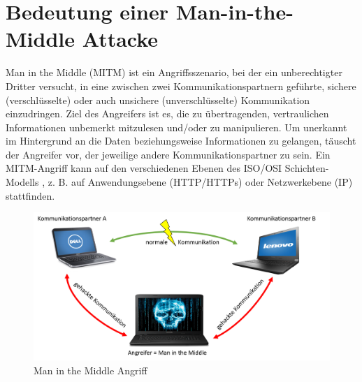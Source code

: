 \section{Bedeutung einer Man-in-the-Middle Attacke}
Man in the Middle (MITM) ist ein Angriffsszenario, bei der ein unberechtigter Dritter versucht, in eine zwischen zwei Kommunikationspartnern geführte, sichere (verschlüsselte) oder auch unsichere (unverschlüsselte) Kommunikation einzudringen. Ziel des Angreifers ist es, die zu übertragenden, vertraulichen Informationen unbemerkt mitzulesen und/oder zu manipulieren. Um unerkannt im Hintergrund an die Daten beziehungsweise Informationen zu gelangen, täuscht der Angreifer vor, der jeweilige andere Kommunikationspartner zu sein. Ein MITM-Angriff kann auf den verschiedenen Ebenen des ISO/OSI Schichten-Modells \cite[vgl.]{osi}, z. B. auf Anwendungsebene (HTTP/HTTPs) oder Netzwerkebene (IP) stattfinden. \cite[vgl.]{mitm-def}
\begin{figure}[H]
	\centering
	\includegraphics[width=.8\linewidth]{images/MITM.png}
	\caption{Man in the Middle Angriff \cite{mitm-bild}}
\end{figure}